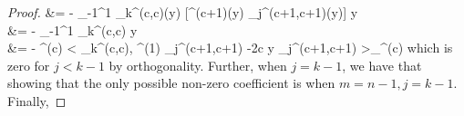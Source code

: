 \begin{proof}
{	&= - \int_{-1}^1 \: \jac_k^{(c,c)}(y) \:  [\jacw^{(c+1)}(y) \: \jac_{j}^{(c+1,c+1)}(y)] \: \D y \\
	&= - \int_{-1}^1 \: \jac_k^{(c,c)}  \: \D y \\
	&= - \: \normjac^{(c)} \: \ip< \jac_k^{(c,c)}, \: \jacw^{(1)} \: \jac_{j}^{(c+1,c+1) \: \prime} -2c \:y \: \jac_{j}^{(c+1,c+1)} >_{\jacw^{(c)}}
}
which is zero for $j < k-1$ by orthogonality. Further, when $j = k-1$, we have that
showing that the only possible non-zero coefficient is when $m=n-1, j=k-1$. Finally,


\end{proof}

